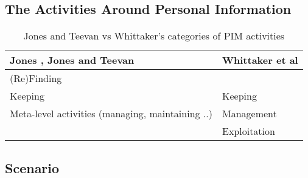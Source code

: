 \documentclass[runningheads,a4paper]{llncs}
\begin{document}

\subsection{The Activities Around Personal Information}

\begin{table}
\begin{tabular}{p{5cm} p{7cm}} 
Jones \cite{jones}, Jones and Teevan \cite{jonesteevan}& Whittaker et al \cite{whittaker}\\
\hline
(Re)Finding &  \\
Keeping & Keeping \\
Meta-level activities (managing, maintaining ..) & Management \\
 & Exploitation \\
\end{tabular}
\caption{Jones and Teevan vs Whittaker's categories of PIM activities}
\label{fig:pimactivities}
\end{table}

\subsection{Scenario}

\subsetion



\end{document}
